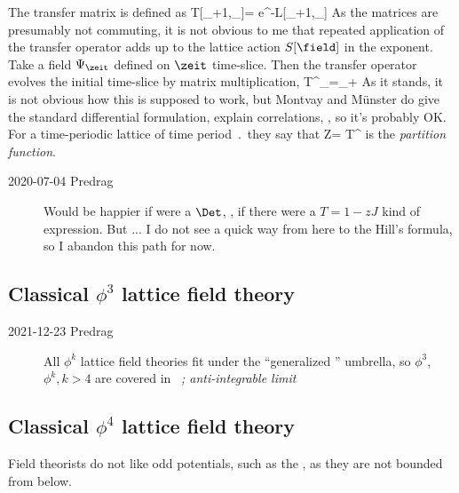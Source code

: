 The transfer matrix is defined as
\beq
T[\Xx_{\zeit+1},\Xx_\zeit]=
        e^{-L[\Xx_{\zeit+1},\Xx_\zeit]}
As the matrices are presumably not commuting,
it is not obvious to me that repeated application of the
transfer operator adds up to the lattice action $S[\field]$
 in the exponent.
Take a field $\Psi_\zeit$ defined on $\zeit$ time-slice. Then the
transfer operator evolves the initial time-slice by matrix multiplication,
\beq
T^\cl{}\Psi_\zeit=\Psi_{\zeit+\cl{}}
As it stands, it is not obvious how this is supposed to work, but Montvay
and M{\"u}nster do give the standard differential
formulation, explain correlations, \etc, so it's probably OK. For a
time-periodic lattice of time period $\period{}$ they say that
\beq
Z= \Tr T^\cl{}
is the \emph{partition function}.

\begin{description}
  \item[2020-07-04 Predrag]
Would be happier if  were a $\Det$,
\ie, if there were a
\(
T=1-zJ
\)
kind of expression. But ...
I do not see a quick way from here to the Hill's formula, so I abandon
this path for now.
\end{description}

\subsection{Classical {$\phi^3$} lattice field theory}
\label{sect:phi3latt}

\begin{description}
  \item[2021-12-23 Predrag]
All {$\phi^k$} lattice field theories fit under the ``generalized
\HenonMap'' umbrella, so {$\phi^3$}, {$\phi^k, k>4$} are covered in
~{\em {\Henlatt}; anti-integrable limit}

\end{description}

\subsection{Classical {$\phi^4$} lattice field theory}
\label{sect:phi4latt}

Field theorists do not like odd potentials, such as the {\henlatt}
, as they are not bounded from below.

